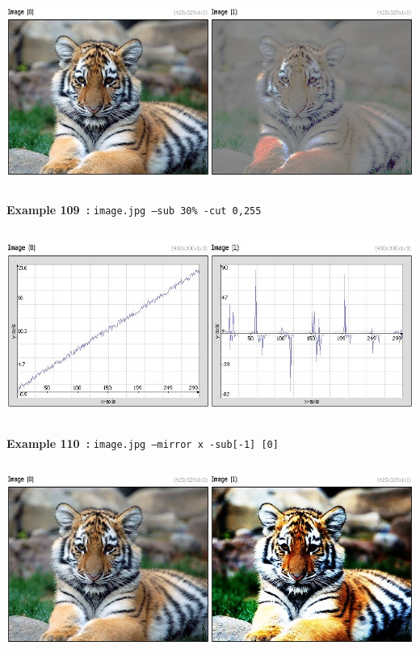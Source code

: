 \documentclass[a4paper,11pt,twoside]{book}
\begin{document}
\begin{center}\includegraphics[keepaspectratio=true,height=7cm,width=\textwidth]{img/gmic_def109.jpg}\\
{\footnotesize \textbf{Example 109~:} \texttt{image.jpg --sub 30\% -cut 0,255}}
\\\includegraphics[keepaspectratio=true,height=7cm,width=\textwidth]{img/gmic_def110.jpg}\\
{\footnotesize \textbf{Example 110~:} \texttt{image.jpg --mirror x -sub[-1] [0]}}
\\\includegraphics[keepaspectratio=true,height=7cm,width=\textwidth]{img/gmic_def111.jpg}\\

\end{center}
\end{document}
